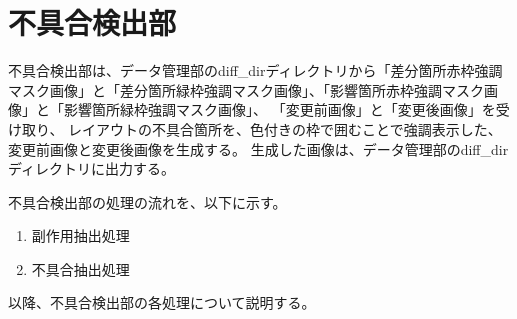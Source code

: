 \section{不具合検出部}\label{sec:Layout_bug_extraction_section}
不具合検出部は、データ管理部のdiff\_dirディレクトリから「差分箇所赤枠強調マスク画像」と「差分箇所緑枠強調マスク画像」、「影響箇所赤枠強調マスク画像」と「影響箇所緑枠強調マスク画像」、
「変更前画像」と「変更後画像」を受け取り、
レイアウトの不具合箇所を、色付きの枠で囲むことで強調表示した、変更前画像と変更後画像を生成する。
生成した画像は、データ管理部のdiff\_dirディレクトリに出力する。
\par
不具合検出部の処理の流れを、以下に示す。
\begin{enumerate}
    \item 副作用抽出処理
    \item 不具合抽出処理
\end{enumerate}
以降、不具合検出部の各処理について説明する。

